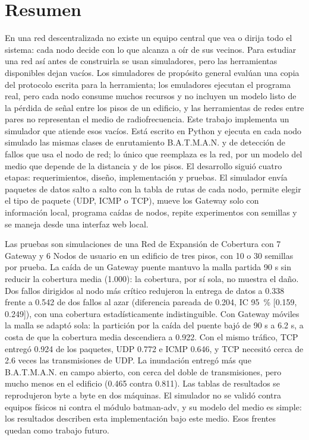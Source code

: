 \section*{Resumen}

En una red descentralizada no existe un equipo central que vea o dirija todo el
sistema: cada nodo decide con lo que alcanza a oír de sus vecinos. Para estudiar
una red así antes de construirla se usan simuladores, pero las herramientas
disponibles dejan vacíos. Los simuladores de propósito general evalúan una copia
del protocolo escrita para la herramienta; los emuladores ejecutan el programa
real, pero cada nodo consume muchos recursos y no incluyen un modelo listo de la
pérdida de señal entre los pisos de un edificio, y las herramientas de redes
entre pares no representan el medio de radiofrecuencia. Este trabajo implementa
un simulador que atiende esos vacíos. Está escrito en Python y ejecuta en cada
nodo simulado las mismas clases de enrutamiento B.A.T.M.A.N. y de detección de
fallos que usa el nodo de red; lo único que reemplaza es la red, por un modelo
del medio que depende de la distancia y de los pisos. El desarrollo siguió cuatro
etapas: requerimientos, diseño, implementación y pruebas. El simulador envía
paquetes de datos salto a salto con la tabla de rutas de cada nodo, permite elegir
el tipo de paquete (UDP, ICMP o TCP), mueve los Gateway solo con información
local, programa caídas de nodos, repite experimentos con semillas y se maneja
desde una interfaz web local.

Las pruebas son simulaciones de una Red de Expansión de Cobertura con 7 Gateway
y 6 Nodos de usuario en un edificio de tres pisos, con 10 o 30 semillas por prueba. La
caída de un Gateway puente mantuvo la malla partida 90 s sin reducir la cobertura
media (1.000): la cobertura, por sí sola, no muestra el daño. Dos fallos dirigidos
al nodo más crítico redujeron la entrega de datos a 0.338 frente a 0.542 de dos
fallos al azar (diferencia pareada de 0.204, IC 95~\% [0.159, 0.249]), con una
cobertura estadísticamente indistinguible. Con Gateway móviles la malla se adaptó
sola: la partición por la caída del puente bajó de 90 s a 6.2 s, a costa de que la
cobertura media descendiera a 0.922. Con el mismo tráfico, TCP entregó 0.924 de
los paquetes, UDP 0.772 e ICMP 0.646, y TCP necesitó cerca de 2.6 veces las
transmisiones de UDP. La inundación entregó más que B.A.T.M.A.N. en campo
abierto, con cerca del doble de transmisiones, pero mucho menos en el edificio
(0.465 contra 0.811). Las tablas de resultados se reprodujeron byte a byte en dos
máquinas. El simulador no se validó contra equipos físicos ni contra el módulo
batman-adv, y su modelo del medio es simple: los resultados describen esta
implementación bajo este medio. Esos frentes quedan como trabajo futuro.

